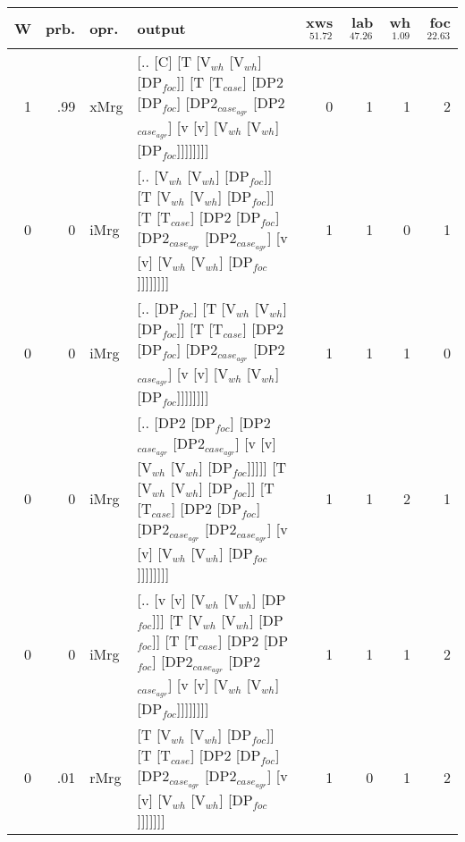 \begin{tabularx}{\linewidth}{rrlXrrrr}
\hline
   W &   prb. & opr.   & output                                                                                                                                                                                               &   xws$^{51.72}$ &   lab$^{47.26}$ &   wh$^{1.09}$ &   foc$^{22.63}$ \\
\hline
   1 &   .99 & xMrg & [.. [C] [T [V$_{wh}$ [V$_{wh}$] [DP$_{foc}$]] [T [T$_{case}$] [DP2 [DP$_{foc}$] [DP2$_{case_{agr}}$ [DP2$_{case_{agr}}$] [v [v] [V$_{wh}$ [V$_{wh}$] [DP$_{foc}$]]]]]]]]                                                                         &             0 &             1 &            1 &             2 \\
   0 &   0 & iMrg & [.. [V$_{wh}$ [V$_{wh}$] [DP$_{foc}$]] [T [V$_{wh}$ [V$_{wh}$] [DP$_{foc}$]] [T [T$_{case}$] [DP2 [DP$_{foc}$] [DP2$_{case_{agr}}$ [DP2$_{case_{agr}}$] [v [v] [V$_{wh}$ [V$_{wh}$] [DP$_{foc}$]]]]]]]]                                                      &             1 &             1 &            0 &             1 \\
   0 &   0 & iMrg & [.. [DP$_{foc}$] [T [V$_{wh}$ [V$_{wh}$] [DP$_{foc}$]] [T [T$_{case}$] [DP2 [DP$_{foc}$] [DP2$_{case_{agr}}$ [DP2$_{case_{agr}}$] [v [v] [V$_{wh}$ [V$_{wh}$] [DP$_{foc}$]]]]]]]]                                                                    &             1 &             1 &            1 &             0 \\
   0 &   0 & iMrg & [.. [DP2 [DP$_{foc}$] [DP2$_{case_{agr}}$ [DP2$_{case_{agr}}$] [v [v] [V$_{wh}$ [V$_{wh}$] [DP$_{foc}$]]]]] [T [V$_{wh}$ [V$_{wh}$] [DP$_{foc}$]] [T [T$_{case}$] [DP2 [DP$_{foc}$] [DP2$_{case_{agr}}$ [DP2$_{case_{agr}}$] [v [v] [V$_{wh}$ [V$_{wh}$] [DP$_{foc}$]]]]]]]] &             1 &             1 &            2 &             1 \\
   0 &   0 & iMrg & [.. [v [v] [V$_{wh}$ [V$_{wh}$] [DP$_{foc}$]]] [T [V$_{wh}$ [V$_{wh}$] [DP$_{foc}$]] [T [T$_{case}$] [DP2 [DP$_{foc}$] [DP2$_{case_{agr}}$ [DP2$_{case_{agr}}$] [v [v] [V$_{wh}$ [V$_{wh}$] [DP$_{foc}$]]]]]]]]                                              &             1 &             1 &            1 &             2 \\
   0 &   .01 & rMrg & [T [V$_{wh}$ [V$_{wh}$] [DP$_{foc}$]] [T [T$_{case}$] [DP2 [DP$_{foc}$] [DP2$_{case_{agr}}$ [DP2$_{case_{agr}}$] [v [v] [V$_{wh}$ [V$_{wh}$] [DP$_{foc}$]]]]]]]                                                                                  &             1 &             0 &            1 &             2 \\
\hline
\end{tabularx}\endgroup\\
